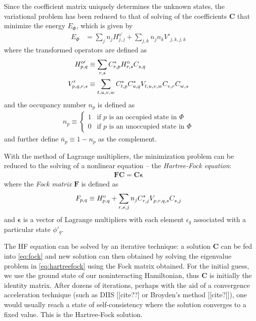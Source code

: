 Since the coefficient matrix uniquely determines the unknown states, the variational problem has been reduced to that of solving of the coefficients $\bm C$ that minimize the energy $E_{\Phi}$, which is given by
\begin{align}
  E_{\Phi} &= \sum_{j} n_j H^{\text{o} \prime}_{j, j} + \sum_{j, k} n_j n_k V'_{j, k, j, k} \label{eq:hfenergy}
\end{align}
where the transformed operators are defined as
\begin{align}
  H^{\text{o} \prime}_{p, q} &\equiv \sum_{r, s} C_{r, p}^* H_{r, s}^{\text o} C_{s, q}^{} \label{eq:hftransform1} \\
  V'_{p, q, r, s} &\equiv \sum_{t, u, v, w} C_{t, p}^* C_{u, q}^* V_{t, u, v, w}^{} C_{v, r}^{} C_{w, s}^{} \label{eq:hftransform2}
\end{align}
and the occupancy number $n_p$ is defined as
\begin{align}
  n_p \equiv \begin{cases}
    1 & \text{if $p$ is an occupied state in $\Phi$} \\
    0 & \text{if $p$ is an unoccupied state in $\Phi$}
  \end{cases}
\end{align}
and further define $\bar n_p \equiv 1 - n_p$ as the complement.

With the method of Lagrange multipliers, the minimization problem can be reduced to the solving of a nonlinear equation -- the \textit{Hartree-Fock equation}:
\begin{align} \label{eq:hartreefock}
  \bm F \bm C = \bm C \bm \epsilon
\end{align}
where the \textit{Fock matrix} $\bm F$ is defined as
\begin{align} \label{eq:fock}
  F_{p, q} \equiv H_{p, q}^{\text o} + \sum_{r, s, j} n_j C_{r, j}^* V_{p, r, q, s}^{} C_{s, j}^{}
\end{align}
and $\bm \epsilon$ is a vector of Lagrange multipliers with each element $\epsilon_q$ associated with a particular state $\phi'_q$.

The HF equation can be solved by an iterative technique: a solution $\bm C$ can be fed into \eqref{eq:fock} and new solution can then obtained by solving the eigenvalue problem in \eqref{eq:hartreefock} using the Fock matrix obtained.  For the initial guess, we use the ground state of our noninteracting Hamiltonian, thus $\bm C$ is initially the identity matrix.  After dozens of iterations, perhaps with the aid of a convergence acceleration technique (such as DIIS [[cite??] or Broyden's method [[cite?]]), one would usually reach a state of self-consistency where the solution converges to a fixed value.  This is the Hartree-Fock solution.

